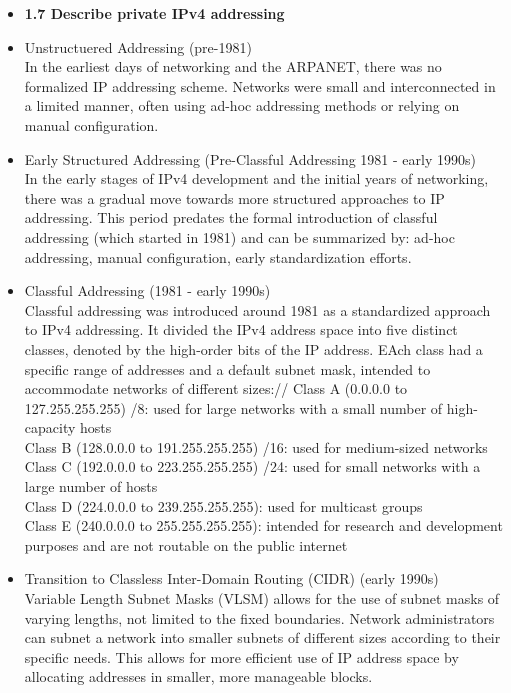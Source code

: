\documentclass{article}
\begin{document}
\begin{itemize}
  \item \textbf{1.7 Describe private IPv4 addressing}
  	\item[] Unstructuered Addressing (pre-1981)\\
		In the earliest days of networking and the ARPANET, there was no formalized IP addressing scheme. Networks were small and interconnected in a limited manner, often using ad-hoc addressing methods or relying on manual configuration.
	\item[] Early Structured Addressing (Pre-Classful Addressing 1981 - early 1990s)\\
		In the early stages of IPv4 development and the initial years of networking, there was a gradual move towards more structured approaches to IP addressing. This period predates the formal introduction of classful addressing (which started in 1981) and can be summarized by: ad-hoc addressing, manual configuration, early standardization efforts.
	\item[] Classful Addressing (1981 - early 1990s)\\
		Classful addressing was introduced around 1981 as a standardized approach to IPv4 addressing. It divided the IPv4 address space into five distinct classes, denoted by the high-order bits of the IP address. EAch class had a specific range of addresses and a default subnet mask, intended to accommodate networks of different sizes://
		Class A (0.0.0.0 to 127.255.255.255) /8: used for large networks with a small number of high-capacity hosts\\
		Class B (128.0.0.0 to 191.255.255.255) /16: used for medium-sized networks\\
		Class C (192.0.0.0 to 223.255.255.255) /24: used for small networks with a large number of hosts\\
		Class D (224.0.0.0 to 239.255.255.255): used for multicast groups\\
		Class E (240.0.0.0 to 255.255.255.255): intended for research and development purposes and are not routable on the public internet
	\item[] Transition to Classless Inter-Domain Routing (CIDR) (early 1990s)\\
		Variable Length Subnet Masks (VLSM) allows for the use of subnet masks of varying lengths, not limited to the fixed boundaries. Network administrators can subnet a network into smaller subnets of different sizes according to their specific needs. This allows for more efficient use of IP address space by allocating addresses in smaller, more manageable blocks.\\

\end{itemize}
\end{document}
